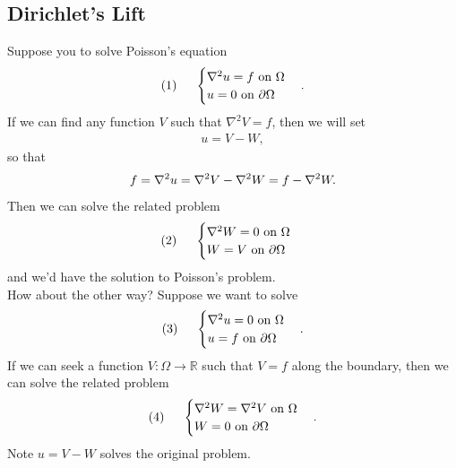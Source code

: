 \documentclass{article}
\theoremstyle{definition}
\newcommand{\p}{\partial}
\newcommand{\R}{\mathbb{R}}
\begin{document}
\subsection{Dirichlet's Lift}
Suppose you to solve Poisson's equation
\begin{align*}
(1)\hspace{0.5cm}\begin{cases}
\nabla^2 u = f \text{ on }\Omega\\
u=0 \text{ on $\p\Omega$}
\end{cases}.
\end{align*}
If we can find any function $V$ such that $\nabla^2 V = f$, then we will set
\begin{align*}
u  =V - W,
\end{align*}
so that
\begin{align*}
f = \laplacian u = \laplacian V - \laplacian W = f - \laplacian W.
\end{align*}
Then we can solve the related problem
\begin{align*}
(2)\hspace{0.5cm}\begin{cases}
\nabla^2 W = 0 \text{ on }\Omega\\
W=V \text{ on $\p\Omega$}
\end{cases}
\end{align*}
and we'd have the solution to Poisson's problem.\\

How about the other way? Suppose we want to solve
\begin{align*}
(3)\hspace{0.5cm}\begin{cases}
\nabla^2 u = 0 \text{ on }\Omega\\
u=f \text{ on $\p\Omega$}
\end{cases}.
\end{align*}
If we can seek a function $V:\Omega \to \R$ such that $V = f$ along the boundary, then we can solve the related problem
\begin{align*}
(4)\hspace{0.5cm}\begin{cases}
\nabla^2 W = \laplacian V \text{ on }\Omega\\
W = 0 \text{ on $\p\Omega$}
\end{cases}.
\end{align*}
Note $u = V-W$ solves the original problem.\\
\end{document}
